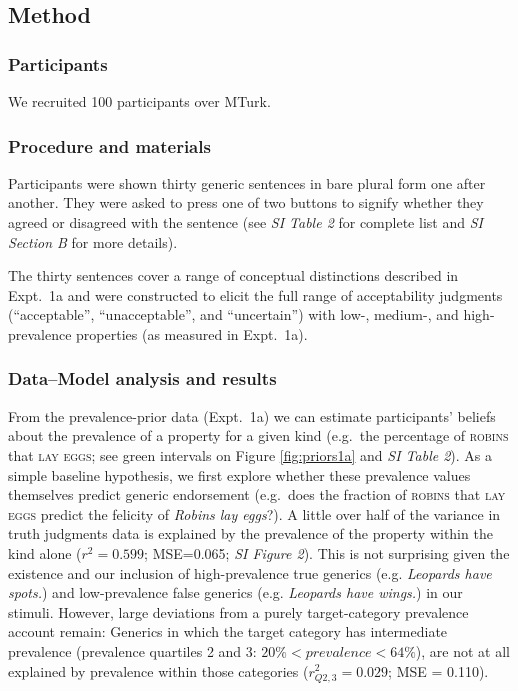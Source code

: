 \documentclass[10pt,letterpaper]{article}
\begin{document}
\subsection*{Method}

\subsubsection*{Participants}

We recruited 100 participants over MTurk. 

\subsubsection*{Procedure and materials}

Participants were shown thirty generic sentences in bare plural form one after another. 
They were asked to press one of two buttons to signify whether they agreed or disagreed with the sentence (see {\it SI Table 2} for complete list and {\it SI Section B} for more details). 

The thirty sentences cover a range of conceptual distinctions described in Expt.~1a and were constructed to elicit the full range of acceptability judgments (``acceptable'', ``unacceptable'', and ``uncertain'') with low-, medium-, and high-prevalence properties (as measured in Expt.~1a).


\subsubsection*{Data--Model analysis and results}
 
From the prevalence-prior data (Expt.~1a) we can estimate participants' beliefs about the prevalence of a property for a given kind (e.g.~the percentage of \textsc{robins} that \textsc{lay eggs}; see green intervals on Figure \ref{fig:priors1a} and \emph{SI Table 2}).
As a simple baseline hypothesis, we first explore whether these prevalence values themselves predict generic endorsement (e.g.~does the fraction of \textsc{robins} that \textsc{lay eggs} predict the felicity of \emph{Robins lay eggs}?).
A little over half of the variance in truth judgments data is explained by the prevalence of the property within the kind alone ($r^2 = 0.599$; MSE=0.065; \emph{SI Figure 2}). 
This is not surprising given the existence and our inclusion of high-prevalence true generics (e.g. \emph{Leopards have spots.}) and low-prevalence false generics (e.g. \emph{Leopards have wings.}) in our stimuli. 
However, large deviations from a purely target-category prevalence account remain: Generics in which the target category has intermediate prevalence (prevalence quartiles 2 and 3: $ 20\% < prevalence < 64\%$), are not at all explained by prevalence within those categories ($r_{Q2,3}^2 = 0.029$; MSE = 0.110).
\end{document}
